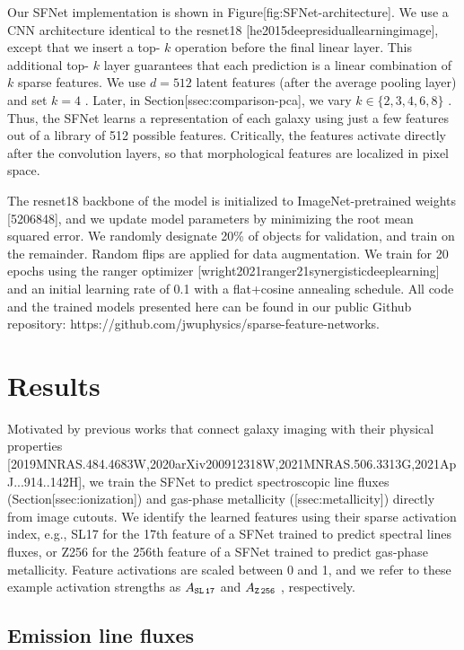 \documentclass[11pt,a4paper]{article}
\begin{document}
Our SFNet implementation is shown in Figure[fig:SFNet-architecture]. We use a CNN architecture identical to the resnet18 [he2015deepresiduallearningimage], except that we insert a top- $k$  operation before the final linear layer. This additional top- $k$  layer guarantees that each prediction is a linear combination of  $k$  sparse features. We use  $d=512$  latent features (after the average pooling layer) and set  $k=4$ . Later, in Section[ssec:comparison-pca], we vary  $k \in \{2, 3, 4, 6, 8\}$ . Thus, the SFNet learns a representation of each galaxy using just a few features out of a library of 512 possible features. Critically, the features activate directly after the convolution layers, so that morphological features are localized in pixel space.

The resnet18 backbone of the model is initialized to ImageNet-pretrained weights [5206848], and we update model parameters by minimizing the root mean squared error. We randomly designate 20\% of objects for validation, and train on the remainder. Random flips are applied for data augmentation. We train for 20 epochs using the ranger optimizer [wright2021ranger21synergisticdeeplearning] and an initial learning rate of 0.1 with a flat+cosine annealing schedule. All code and the trained models presented here can be found in our public Github repository: https://github.com/jwuphysics/sparse-feature-networks.

\section{Results}

Motivated by previous works that connect galaxy imaging with their physical properties [2019MNRAS.484.4683W,2020arXiv200912318W,2021MNRAS.506.3313G,2021ApJ...914..142H], we train the SFNet to predict spectroscopic line fluxes (Section[ssec:ionization]) and gas-phase metallicity ([ssec:metallicity]) directly from image cutouts. We identify the learned features using their sparse activation index, e.g., SL17 for the 17th feature of a SFNet trained to predict spectral lines fluxes, or Z256 for the 256th feature of a SFNet trained to predict gas-phase metallicity. Feature activations are scaled between 0 and 1, and we refer to these example activation strengths as  $A_{\tt SL\,17}$  and  $A_{\tt Z\,256}$ , respectively.

\subsection{Emission line fluxes}
\end{document}
